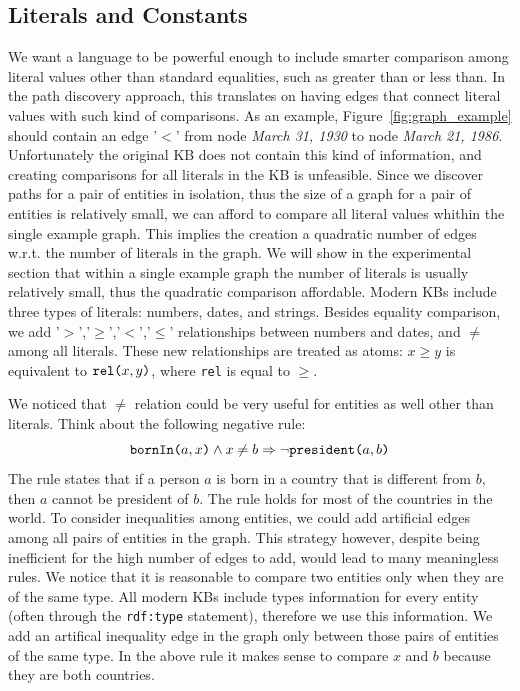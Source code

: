 \subsection{Literals and Constants}
We want a language to be powerful enough to include smarter comparison among literal values other than standard equalities, such as greater than or less than. In the path discovery approach, this translates on having edges that connect literal values with such kind of comparisons. As an example, Figure~\ref{fig:graph_example} should contain an edge '$<$' from node \textit{March 31, 1930} to node \textit{March 21, 1986}. Unfortunately the original KB does not contain this kind of information, and creating comparisons for all literals in the KB is unfeasible. Since we discover paths for a pair of entities in isolation, thus the size of a graph for a pair of entities is relatively small, we can afford to compare all literal values whithin the single example graph. This implies the creation a quadratic number of edges w.r.t. the number of literals in the graph. We will show in the experimental section that within a single example graph the number of literals is usually relatively small, thus the quadratic comparison affordable. Modern KBs include three types of literals: numbers, dates, and strings. Besides equality comparison, we add '$>$','$\geq$','$<$','$\leq$' relationships between numbers and dates, and $\neq$ among all literals. These new relationships are treated as atoms: $x \geq y$ is equivalent to $\texttt{rel(}x,y\texttt{)}$, where \texttt{rel} is equal to $\geq$.

We noticed that $\neq$ relation could be very useful for entities as well other than literals. Think about the following negative rule:
$$ \texttt{bornIn(}a,x\texttt{)} \wedge x \neq b \Rightarrow \neg \texttt{president(}a,b\texttt{)} $$
The rule states that if a person $a$ is born in a country that is different from $b$, then $a$ cannot be president of $b$. The rule holds for most of the countries in the world. To consider inequalities among entities, we could add artificial edges among all pairs of entities in the graph. This strategy however, despite being inefficient for the high number of edges to add, would lead to many meaningless rules. We notice that it is reasonable to compare two entities only when they are of the same type. All modern KBs include types information for every entity (often through the \texttt{rdf:type} statement), therefore we use this information. We add an artifical inequality edge in the graph only between those pairs of entities of the same type. In the above rule it makes sense to compare $x$ and $b$ because they are both countries.




